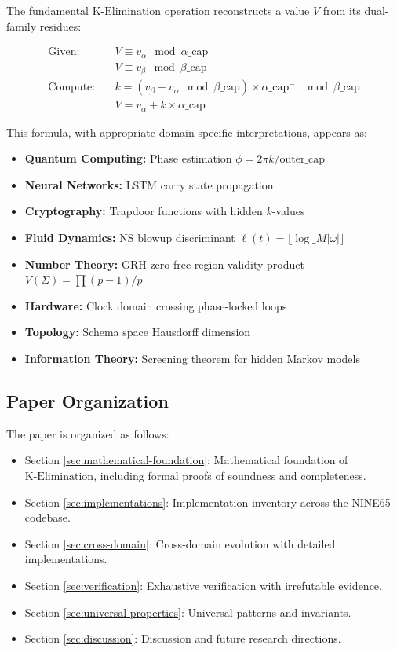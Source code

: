 \documentclass[11pt,letterpaper]{article}
\newcommand{\KElim}{\text{K-Elimination}}
\begin{document}
The fundamental \(\KElim\) operation reconstructs a value \(V\) from its dual-family residues:

\begin{equation}\label{eq:kelim}
\begin{aligned}
\text{Given:} \quad & V \equiv v_{\alpha} \mod \alpha\text{\_cap} \\
& V \equiv v_{\beta} \mod \beta\text{\_cap} \\
\text{Compute:} \quad & k = (v_{\beta} - v_{\alpha} \mod \beta\text{\_cap}) \times \alpha\text{\_cap}^{-1} \mod \beta\text{\_cap} \\
& V = v_{\alpha} + k \times \alpha\text{\_cap}
\end{aligned}
\end{equation}

This formula, with appropriate domain-specific interpretations, appears as:

\begin{itemize}
\item {\bf Quantum Computing:} Phase estimation \(\phi = 2\pi k / \text{outer\_cap}\)
\item {\bf Neural Networks:} LSTM carry state propagation
\item {\bf Cryptography:} Trapdoor functions with hidden \(k\)-values
\item {\bf Fluid Dynamics:} NS blowup discriminant \(\ell(t) = \lfloor \log\_M |\omega| \rfloor\)
\item {\bf Number Theory:} GRH zero-free region validity product \(V(\Sigma) = \prod (p-1)/p\)
\item {\bf Hardware:} Clock domain crossing phase-locked loops
\item {\bf Topology:} Schema space Hausdorff dimension
\item {\bf Information Theory:} Screening theorem for hidden Markov models
\end{itemize}

\subsection{Paper Organization}

The paper is organized as follows:

\begin{itemize}
\item Section \ref{sec:mathematical-foundation}: Mathematical foundation of \(\KElim\), including formal proofs of soundness and completeness.
\item Section \ref{sec:implementations}: Implementation inventory across the NINE65 codebase.
\item Section \ref{sec:cross-domain}: Cross-domain evolution with detailed implementations.
\item Section \ref{sec:verification}: Exhaustive verification with irrefutable evidence.
\item Section \ref{sec:universal-properties}: Universal patterns and invariants.
\item Section \ref{sec:discussion}: Discussion and future research directions.
\end{itemize}
\end{document}
